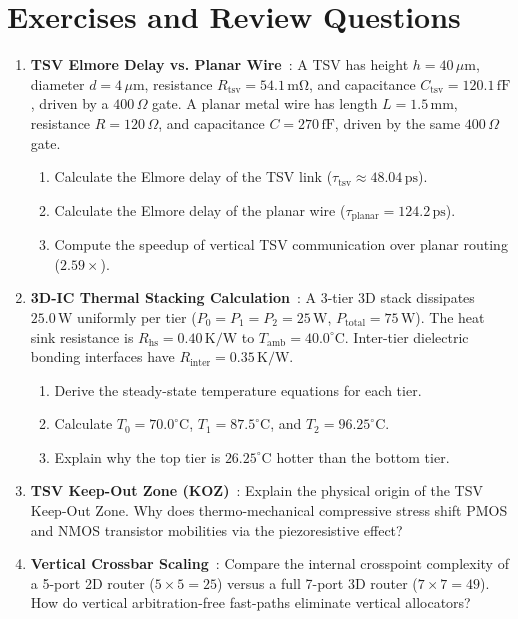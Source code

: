 \section{Exercises and Review Questions}
\label{sec:ch8_exercises}

\begin{enumerate}
    \item \textbf{TSV Elmore Delay vs. Planar Wire}~\cite{Loi2011,Pavlidis2009}: A TSV has height $h = 40\,\mu\mathrm{m}$, diameter $d = 4\,\mu\mathrm{m}$, resistance $R_{\mathrm{tsv}} = 54.1\,\mathrm{m\Omega}$, and capacitance $C_{\mathrm{tsv}} = 120.1\,\mathrm{fF}$, driven by a $400\,\Omega$ gate. A planar metal wire has length $L = 1.5\,\mathrm{mm}$, resistance $R = 120\,\Omega$, and capacitance $C = 270\,\mathrm{fF}$, driven by the same $400\,\Omega$ gate.
    \begin{enumerate}
        \item Calculate the Elmore delay of the TSV link ($\tau_{\mathrm{tsv}} \approx 48.04\,\mathrm{ps}$).
        \item Calculate the Elmore delay of the planar wire ($\tau_{\mathrm{planar}} = 124.2\,\mathrm{ps}$).
        \item Compute the speedup of vertical TSV communication over planar routing ($2.59\times$).
    \end{enumerate}

    \item \textbf{3D-IC Thermal Stacking Calculation}~\cite{Skadron2003,Huang2006,Chao2013}: A 3-tier 3D stack dissipates $25.0\,\mathrm{W}$ uniformly per tier ($P_0 = P_1 = P_2 = 25\,\mathrm{W}$, $P_{\mathrm{total}} = 75\,\mathrm{W}$). The heat sink resistance is $R_{\mathrm{hs}} = 0.40\,\mathrm{K/W}$ to $T_{\mathrm{amb}} = 40.0^\circ\mathrm{C}$. Inter-tier dielectric bonding interfaces have $R_{\mathrm{inter}} = 0.35\,\mathrm{K/W}$.
    \begin{enumerate}
        \item Derive the steady-state temperature equations for each tier.
        \item Calculate $T_0 = 70.0^\circ\mathrm{C}$, $T_1 = 87.5^\circ\mathrm{C}$, and $T_2 = 96.25^\circ\mathrm{C}$.
        \item Explain why the top tier is $26.25^\circ\mathrm{C}$ hotter than the bottom tier.
    \end{enumerate}

    \item \textbf{TSV Keep-Out Zone (KOZ)}~\cite{Pavlidis2009,Loi2011}: Explain the physical origin of the TSV Keep-Out Zone. Why does thermo-mechanical compressive stress shift PMOS and NMOS transistor mobilities via the piezoresistive effect?

    \item \textbf{Vertical Crossbar Scaling}~\cite{More2018,Seiculescu2010}: Compare the internal crosspoint complexity of a 5-port 2D router ($5 \times 5 = 25$) versus a full 7-port 3D router ($7 \times 7 = 49$). How do vertical arbitration-free fast-paths eliminate vertical allocators?
\end{enumerate}

